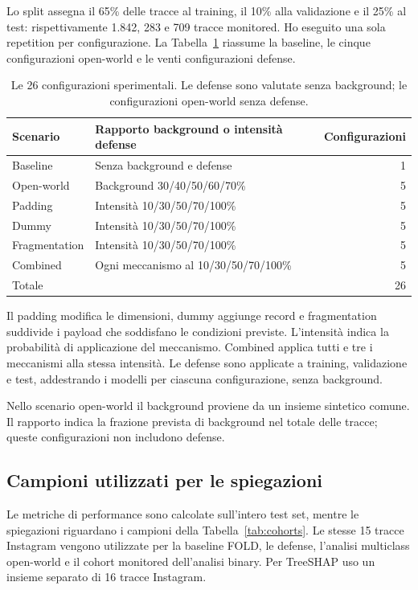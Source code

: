 \documentclass[11pt,a4paper]{article}
\begin{document}
Lo split assegna il 65\% delle tracce al training, il 10\% alla validazione e il 25\% al test: rispettivamente 1.842, 283 e 709 tracce monitored. Ho eseguito una sola repetition per configurazione. La Tabella~\ref{tab:campaign} riassume la baseline, le cinque configurazioni open-world e le venti configurazioni defense.

\begin{table}[htbp]
\centering\small
\caption{Le 26 configurazioni sperimentali. Le defense sono valutate senza background; le configurazioni open-world senza defense.}
\label{tab:campaign}
\begin{tabular}{llr}
\toprule
Scenario & Rapporto background o intensità defense & Configurazioni \\
\midrule
Baseline & Senza background e defense & 1 \\
Open-world & Background 30/40/50/60/70\% & 5 \\
Padding & Intensità 10/30/50/70/100\% & 5 \\
Dummy & Intensità 10/30/50/70/100\% & 5 \\
Fragmentation & Intensità 10/30/50/70/100\% & 5 \\
Combined & Ogni meccanismo al 10/30/50/70/100\% & 5 \\
\midrule
Totale & & 26 \\
\bottomrule
\end{tabular}
\end{table}

Il padding modifica le dimensioni, dummy aggiunge record e fragmentation suddivide i payload che soddisfano le condizioni previste. L'intensità indica la probabilità di applicazione del meccanismo. Combined applica tutti e tre i meccanismi alla stessa intensità. Le defense sono applicate a training, validazione e test, addestrando i modelli per ciascuna configurazione, senza background.

Nello scenario open-world il background proviene da un insieme sintetico comune. Il rapporto indica la frazione prevista di background nel totale delle tracce; queste configurazioni non includono defense.

\subsection{Campioni utilizzati per le spiegazioni}
Le metriche di performance sono calcolate sull'intero test set, mentre le spiegazioni riguardano i campioni della Tabella~\ref{tab:cohorts}. Le stesse 15 tracce Instagram vengono utilizzate per la baseline FOLD, le defense, l'analisi multiclass open-world e il cohort monitored dell'analisi binary. Per TreeSHAP uso un insieme separato di 16 tracce Instagram.
\end{document}
